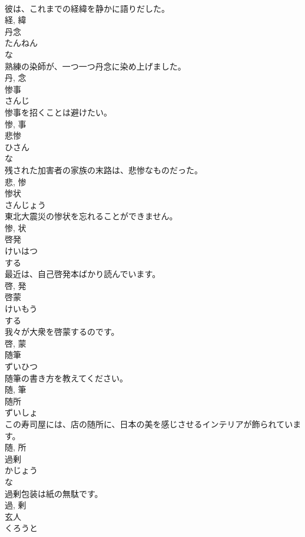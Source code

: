 \documentclass[8pt]{extreport}
\begin{document}
\begin{CJK}{UTF8}{min}
\\	彼は、これまでの経緯を静かに語りだした。	
\\	経, 緯	
\\	丹念	
\\	たんねん	
\\	な 
\\	熟練の染師が、一つ一つ丹念に染め上げました。	
\\	丹, 念	
\\	惨事	
\\	さんじ	
\\	惨事を招くことは避けたい。	
\\	惨, 事	
\\	悲惨	
\\	ひさん	
\\	な 
\\	残された加害者の家族の末路は、悲惨なものだった。	
\\	悲, 惨	
\\	惨状	
\\	さんじょう	
\\	東北大震災の惨状を忘れることができません。	
\\	惨, 状	
\\	啓発	
\\	けいはつ	
\\	する 
\\	最近は、自己啓発本ばかり読んでいます。	
\\	啓, 発	
\\	啓蒙	
\\	けいもう	
\\	する 
\\	我々が大衆を啓蒙するのです。	
\\	啓, 蒙	
\\	随筆	
\\	ずいひつ	
\\	随筆の書き方を教えてください。	
\\	随, 筆	
\\	随所	
\\	ずいしょ	
\\	この寿司屋には、店の随所に、日本の美を感じさせるインテリアが飾られています。	
\\	随, 所	
\\	過剰	
\\	かじょう	
\\	な 
\\	過剰包装は紙の無駄です。	
\\	過, 剰	
\\	玄人	
\\	くろうと	

\end{CJK}
\end{document}
